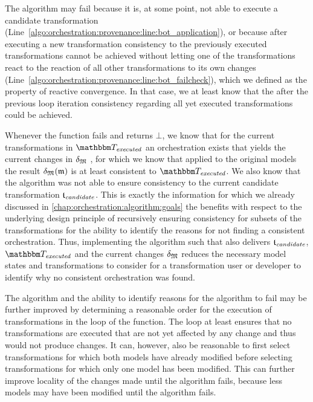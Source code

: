 The algorithm may fail because it is, at some point, not able to execute a candidate transformation (Line~\ref{algo:orchestration:provenance:line:bot_application}), or because after executing a new transformation consistency to the previously executed transformations cannot be achieved without letting one of the transformations react to the reaction of all other transformations to its own changes (Line~\ref{algo:orchestration:provenance:line:bot_failcheck}), which we defined as the property of reactive convergence.
In that case, we at least know that the after the previous loop iteration consistency regarding all yet executed transformations could be achieved.

Whenever the  function fails and returns $\bot$, we know that for the current transformations in $\provalgexecuted$ an orchestration exists that yields the current changes in $\mathfrak{\delta}_{\mathfrak{M}}$ %
, for which we know that applied to the original models the result $\mathfrak{\delta}_{\mathfrak{M}}(\mathfrak{m})$%
is at least consistent to $\provalgexecuted$.
We also know that the algorithm was not able to ensure consistency to the current candidate transformation $\mathfrak{t}_{\mathit{candidate}}$.
This is exactly the information for which we already discussed in \autoref{chap:orchestration:algorithm:goals} the benefits with respect to the underlying design principle of recursively ensuring consistency for subsets of the transformations for the ability to identify the reasons for not finding a consistent orchestration.
Thus, implementing the algorithm such that also delivers $\mathfrak{t}_{\mathit{candidate}}$, $\provalgexecuted$ and the current changes $\mathfrak{\delta}_{\mathfrak{M}}$ reduces the necessary model states and transformations to consider for a transformation user or developer to identify why no consistent orchestration was found.


The algorithm and the ability to identify reasons for the algorithm to fail may be further improved by determining a reasonable order for the execution of transformations in the loop of the  function.
The loop at least ensures that no transformations are executed that are not yet affected by any change and thus would not produce changes.
It can, however, also be reasonable to first select transformations for which both models have already modified before selecting transformations for which only one model has been modified.
This can further improve locality of the changes made until the algorithm fails, because less models may have been modified until the algorithm fails.



